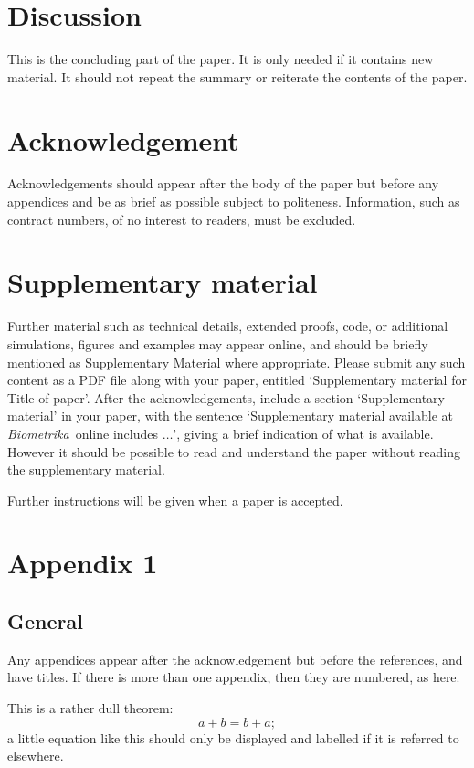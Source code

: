 \documentclass[article,lineno]{biometrika}
\def\Bka{{\it Biometrika}}
\begin{document}
\section{Discussion}

This is the concluding part of the paper.  It is only needed if it contains new material.
It  should not repeat the summary or reiterate the contents of the paper.

\section*{Acknowledgement}
Acknowledgements should appear after the body of the paper but before any appendices and be as brief as possible
subject to politeness. Information, such as contract numbers, of no interest to readers, must
be excluded.

\section*{Supplementary material}
\label{SM}
Further material such as technical details, extended proofs, code, or additional  simulations, figures and examples may appear online, and should be briefly mentioned as Supplementary Material where appropriate.  Please submit any such content as a PDF file along with your paper, entitled `Supplementary material for Title-of-paper'.  After the acknowledgements, include a section `Supplementary material' in your paper, with the sentence `Supplementary material available at \Bka\ online includes $\ldots$', giving a brief indication of what is available.  However it should be possible to read and understand the paper without reading the supplementary material.

Further instructions will be given when a paper is accepted.


\appendix

\appendixone
\section*{Appendix 1}
\subsection*{General}

Any appendices appear after the acknowledgement but before the references, and have titles. If there is more than one appendix, then they are numbered, as here.

\begin{theorem}
This is a rather dull theorem:
\begin{equation}
\label{A1}
a + b = b + a;
\end{equation}
a little equation like this should only be displayed and labelled if it is referred to elsewhere.
\end{theorem}
\end{document}
